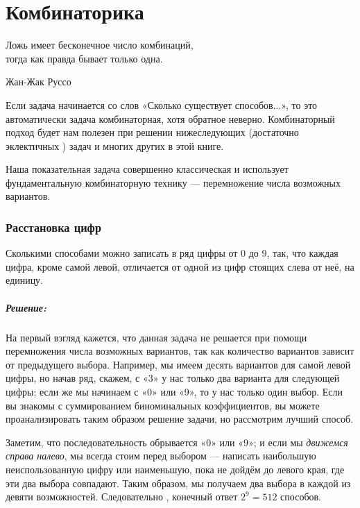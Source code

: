 ﻿\chapter*{Комбинаторика}

\epigraph{Ложь имеет бесконечное число комбинаций,\\
тогда как правда бывает только одна.}{Жан-Жак Руссо}


                                                                             
                                                        
Если задача начинается со слов  «Сколько существует способов...», то это автоматически задача комбинаторная, хотя обратное неверно.   Комбинаторный подход 
будет нам полезен при решении нижеследующих (достаточно эклектичных%
) задач и многих других в этой книге.   


Наша показательная задача совершенно классическая и использует фундаментальную
комбинаторную технику  --- перемножение числа%
возможных вариантов.   




\subsection*{Расстановка цифр}%


Сколькими способами можно записать в ряд цифры от 0 до 9, так, что каждая цифра, кроме самой левой, отличается от одной из цифр стоящих слева от неё, на единицу.%


\paragraph{Решение:} На первый взгляд кажется, что данная задача не решается  при помощи  перемножения числа %
возможных вариантов, так как количество вариантов зависит от предыдущего выбора.
Например, мы имеем %
десять вариантов для самой левой цифры,
но начав ряд, скажем,  с «3» у нас только два варианта для следующей цифры; если же мы начинаем с «0» или  «9», то у нас только один выбор. Если вы знакомы с суммированием биноминальных коэффициентов, вы можете проанализировать таким образом решение задачи, но рассмотрим лучший способ. %


Заметим, что последовательность обрывается %
«0» или «9»; и %
если мы \emph{движемся справа налево}, мы всегда  %
стоим перед выбором --- написать наибольшую неиспользованную цифру или наименьшую, пока не дойдём до левого края, где эти два выбора совпадают.
Таким образом, мы получаем два выбора в каждой из девяти возможностей.
Следовательно%
, конечный ответ $2^9=512$ способов.\heart


